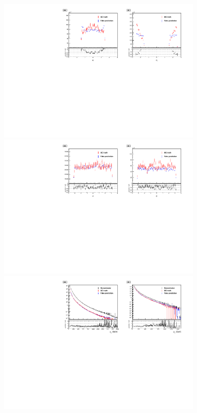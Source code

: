 \begin{figure}[!htbp]
\centering
\includegraphics[width=0.9\textwidth]{fig/closure_test_photon_kinematics_eta_2018sans_Denom.pdf}\\
\includegraphics[width=0.9\textwidth]{fig/closure_test_photon_kinematics_phi_2018sans_Denom.pdf} \\
\includegraphics[width=0.9\textwidth]{fig/closure_test_photon_kinematics_pt_2018.pdf}

\end{figure}
